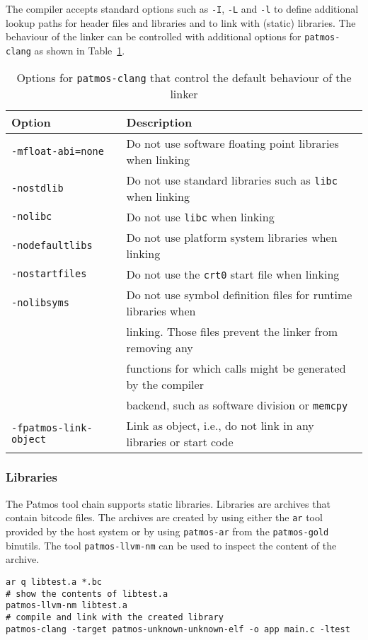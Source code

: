 The compiler accepts standard options such as \texttt{-I}, \texttt{-L} and \texttt{-l} to define additional
lookup paths for header files and libraries and to link with (static) libraries.
The behaviour of the linker can be controlled with additional options for \texttt{patmos-clang} 
as shown in Table~\ref{tab:linker_options}.

\begin{table}
\centering
\begin{tabular}{ll}
Option & Description \\ \hline
\texttt{-mfloat-abi=none} & Do not use software floating point libraries when linking \\
\texttt{-nostdlib} & Do not use standard libraries such as \texttt{libc} when linking \\
\texttt{-nolibc} & Do not use \texttt{libc} when linking \\
\texttt{-nodefaultlibs} & Do not use platform system libraries when linking\\
\texttt{-nostartfiles} & Do not use the \texttt{crt0} start file when linking \\
\texttt{-nolibsyms} & Do not use symbol definition files for runtime libraries when\\
                    & linking. Those files prevent the linker from removing any \\
		    & functions for which calls might be generated by the compiler \\
		    & backend, such as software division or \texttt{memcpy} \\
\texttt{-fpatmos-link-object} & Link as object, i.e., do not link in any libraries or start code 
\end{tabular}
\caption{Options for \texttt{patmos-clang} that control the default behaviour of the linker}
\label{tab:linker_options}
\end{table}

\subsubsection{Libraries}

The Patmos tool chain supports static libraries. Libraries are archives that contain
bitcode files. The archives are created by using either the \texttt{ar}
tool provided by the host system or by using \texttt{patmos-ar} from the \texttt{patmos-gold} binutils. The tool
\texttt{patmos-llvm-nm} can be used to inspect the content of the archive.

\begin{verbatim}
ar q libtest.a *.bc
# show the contents of libtest.a
patmos-llvm-nm libtest.a
# compile and link with the created library
patmos-clang -target patmos-unknown-unknown-elf -o app main.c -ltest
\end{verbatim}



